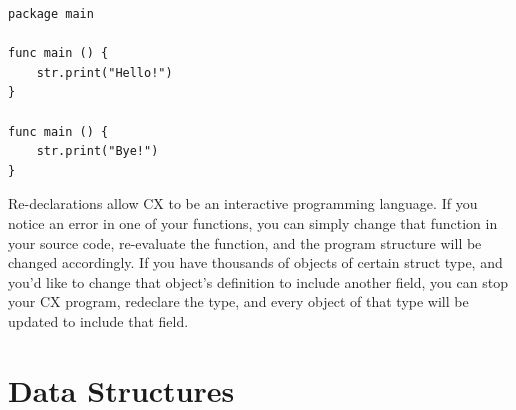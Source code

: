 \documentclass[11pt,fleqn,openany]{book} %
\begin{document}
\begin{lstlisting}[caption={Example Function Redefinition},captionpos=b,label={listing:example-redefinition}]
package main

func main () {
	str.print("Hello!")
}

func main () {
	str.print("Bye!")
}
\end{lstlisting}

Re-declarations allow CX to be an interactive programming language. If you notice an error in one of your functions, you can simply change that function in your source code, re-evaluate the function, and the program structure will be changed accordingly. If you have thousands of objects of certain struct type, and you'd like to change that object's definition to include another field, you can stop your CX program, redeclare the type, and every object of that type will be updated to include that field.




\chapter{Data Structures}
\label{chapter:data-structures}

\end{document}
